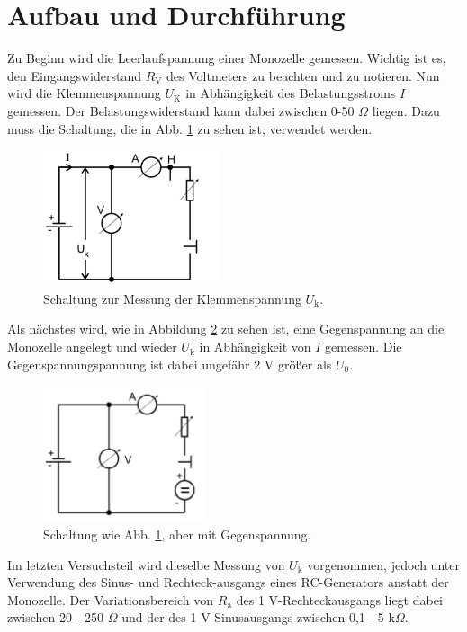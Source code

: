 \section{Aufbau und Durchführung}

Zu Beginn wird die Leerlaufspannung einer Monozelle gemessen. Wichtig ist es, den Eingangswiderstand $R_\text{V}$ des Voltmeters zu beachten und zu notieren. 
Nun wird die Klemmenspannung $U_\text{K}$ in Abhängigkeit des Belastungsstroms $I$ gemessen. Der Belastungswiderstand kann dabei zwischen 0-50 $\Omega$ liegen. Dazu muss die Schaltung, die in Abb. \ref{fig:2} zu sehen ist, verwendet werden.
\begin{figure}[h]
  \centering
  \includegraphics[height=4cm]{Grafiken/2.pdf}
  \caption{Schaltung zur Messung der Klemmenspannung $U_\text{k}$. \cite{1}}
  \label{fig:2}
\end{figure}
Als nächstes wird, wie in Abbildung \ref{fig:3} zu sehen ist, eine Gegenspannung an die Monozelle angelegt und wieder $U_\text{k}$ in Abhängigkeit von $I$ gemessen. Die Gegenspannungspannung ist dabei ungefähr 2 V größer als $U_0$. 
\begin{figure}[h]
  \centering
  \includegraphics[height=4cm]{Grafiken/3.pdf}
  \caption{Schaltung wie Abb. \ref{fig:2}, aber mit Gegenspannung. \cite{1}}
  \label{fig:3}
\end{figure}
Im letzten Versuchsteil wird dieselbe Messung von $U_\text{k}$ vorgenommen, jedoch unter Verwendung des Sinus- und Rechteck-ausgangs eines RC-Generators anstatt der Monozelle.
Der Variationsbereich von $R_\text{a}$ des 1 V-Rechteckausgangs liegt dabei zwischen 20 - 250 $\Omega$ und der des 1 V-Sinusausgangs zwischen 0,1 - 5 k$\Omega$.
